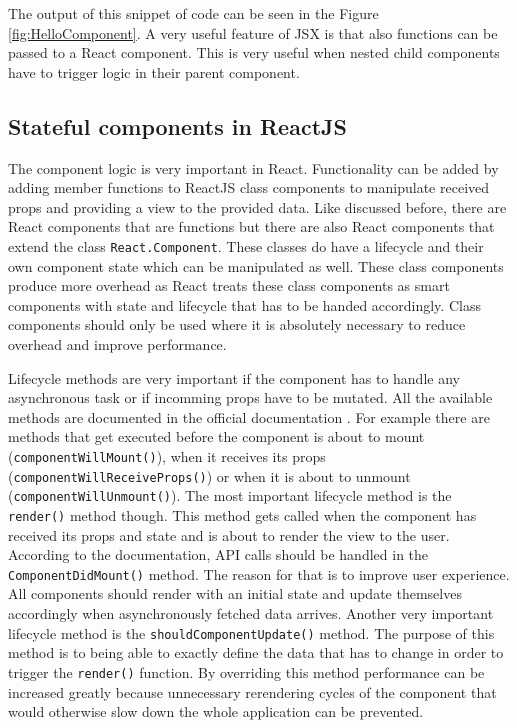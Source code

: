 The output of this snippet of code can be seen in the Figure \ref{fig:HelloComponent}. A very useful feature of JSX is that also functions can be passed to a React component. This is very useful when nested child components have to trigger logic in their parent component.

\subsection{Stateful components in ReactJS}

The component logic is very important in React. Functionality can be added by adding member functions to ReactJS class components to manipulate received props and providing a view to the provided data. Like discussed before, there are React components that are functions but there are also React components that extend the class \texttt{React.Component}. These classes do have a lifecycle and their own component state which can be manipulated as well. These class components produce more overhead as React treats these class components as smart components with state and lifecycle that has to be handed accordingly. Class components should only be used where it is absolutely necessary to reduce overhead and improve performance.

Lifecycle methods are very important if the component has to handle any asynchronous task or if incomming props have to be mutated. All the available methods are documented in the official documentation \cite[Docs: React.Component]{FacebookInc.2013}. For example there are methods that get executed before the component is about to mount (\texttt{componentWillMount()}), when it receives its props (\texttt{componentWillReceiveProps()}) or when it is about to unmount (\texttt{componentWillUnmount()}). The most important lifecycle method is the \texttt{render()} method though. This method gets called when the component has received its props and state and is about to render the view to the user. According to the documentation, API calls should be handled in the \texttt{ComponentDidMount()} method. The reason for that is to improve user experience. All components should render with an initial state and update themselves accordingly when asynchronously fetched data arrives. Another very important lifecycle method is the \texttt{shouldComponentUpdate()} method. The purpose of this method is to being able to exactly define the data that has to change in order to trigger the \texttt{render()} function. By overriding this method performance can be increased greatly because unnecessary rerendering cycles of the component that would otherwise slow down the whole application can be prevented.

